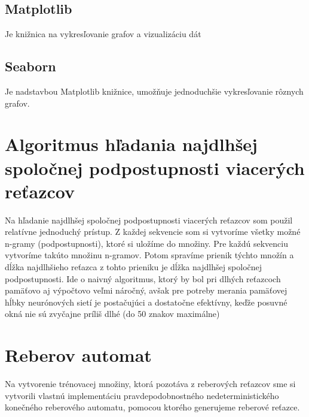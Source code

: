 \subsection{Matplotlib}
Je knižnica na vykresľovanie grafov a vizualizáciu dát
\subsection{Seaborn}
Je nadstavbou Matplotlib knižnice, umožňuje jednoduchšie vykresľovanie rôznych grafov.

\section{Algoritmus hľadania najdlhšej spoločnej podpostupnosti viacerých reťazcov}
Na hľadanie najdlhšej spoločnej podpostupnosti viacerých reťazcov som použil relatívne jednoduchý prístup. 
Z každej sekvencie som si vytvoríme všetky možné n-gramy (podpostupnosti), ktoré si uložíme do množiny.
Pre každú sekvenciu vytvoríme takúto množinu n-gramov. Potom spravíme prienik týchto množín a dĺžka najdlhšieho 
reťazca z tohto prieniku je dĺžka najdlhšej spoločnej podpostupnosti. Ide o naivný algoritmus, ktorý by bol pri
dlhých reťazcoch pamäťovo aj výpočtovo veľmi náročný, avšak pre potreby merania pamäťovej hĺbky neurónových sietí
je postačujúci a dostatočne efektívny, keďže posuvné okná nie sú zvyčajne príliš dlhé (do 50 znakov maximálne)

\section{Reberov automat}
Na vytvorenie trénovacej množiny, ktorá pozotáva z reberových reťazcov sme si vytvorili vlastnú implementáciu pravdepodobnostného nedeterministického
konečného reberového automatu, pomocou ktorého generujeme reberové reťazce.